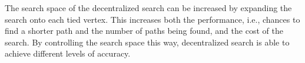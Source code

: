 The search space of the decentralized search can be increased by expanding the search onto each tied vertex. This increases both the performance, i.e., chances to find a shorter path and the number of paths being found, and the cost of the search. By controlling the search space this way, decentralized search is able to achieve different levels of accuracy.


